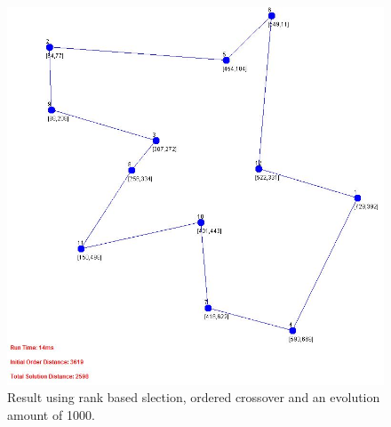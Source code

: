 \documentclass[article]{IEEEtran}
\begin{document}
\begin{figure}[H]
\centering
  \includegraphics[width=.9\linewidth]{images/ordered_rank_015_1000_false}
  \caption{Result using rank based slection, ordered crossover and an evolution amount of 1000.}
  \label{fig:9}
\end{figure}
\end{document}
